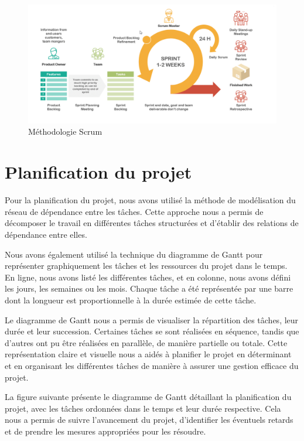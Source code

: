 \begin{figure}[H]
\centering
\includegraphics[width=\linewidth]{images/scrum.png}
\caption{Méthodologie Scrum}\label{fig:scrum}
\end{figure}

\section{Planification du projet}
Pour la planification du projet, nous avons utilisé la méthode de modélisation du réseau de dépendance entre les tâches. Cette approche nous a permis de décomposer le travail en différentes tâches structurées et d'établir des relations de dépendance entre elles.

Nous avons également utilisé la technique du diagramme de Gantt pour représenter graphiquement les tâches et les ressources du projet dans le temps. En ligne, nous avons listé les différentes tâches, et en colonne, nous avons défini les jours, les semaines ou les mois. Chaque tâche a été représentée par une barre dont la longueur est proportionnelle à la durée estimée de cette tâche.

Le diagramme de Gantt nous a permis de visualiser la répartition des tâches, leur durée et leur succession. Certaines tâches se sont réalisées en séquence, tandis que d'autres ont pu être réalisées en parallèle, de manière partielle ou totale. Cette représentation claire et visuelle nous a aidés à planifier le projet en déterminant et en organisant les différentes tâches de manière à assurer une gestion efficace du projet.

La figure suivante présente le diagramme de Gantt détaillant la planification du projet, avec les tâches ordonnées dans le temps et leur durée respective. Cela nous a permis de suivre l'avancement du projet, d'identifier les éventuels retards et de prendre les mesures appropriées pour les résoudre.


